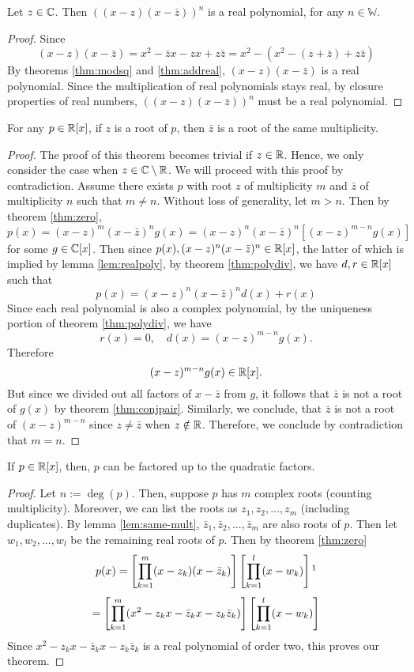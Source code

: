 \begin{lemma}
\label{lem:realpoly}
Let $z\in\mathbb{C}$. Then $((x-z)(x-\bar z))^n$ is a real polynomial, for any $n\in\mathbb{W}$.
\end{lemma}
\begin{proof}
	Since
	$$(x-z)(x-\bar z)=x^2-\bar z x -zx+z\bar z=x^2-(x^2-(z+\bar z)+z\bar z)$$
	By theorems \eqref{thm:modsq} and \eqref{thm:addreal},
	$(x-z)(x-\bar z)$ is a real polynomial. 
	Since the multiplication of real polynomials stays real, by closure properties of real numbers, $((x-z)(x-\bar z))^n$ must be a real polynomial.
\end{proof}


\begin{lemma}
\label{lem:same-mult}
	For any $p\in \mathbb{R}[x]$, if $z$ is a root of $p$, then $\bar z$ is a root of the same multiplicity.
\end{lemma}
\begin{proof}
	The proof of this theorem becomes trivial if $z\in \mathbb{R}$.
	Hence, we only consider the case when $z\in \mathbb{C}\setminus \mathbb{R}$.
	We will proceed with this proof by contradiction.
	Assume there exists $p$ with root $z$ of multiplicity $m$ and $\bar z$ of multiplicity $n$ such that $m\neq n$. 
	Without loss of generality, let $m>n$.
	Then by theorem \eqref{thm:zero},
	$$p(x)=(x-z)^m(x-\bar z)^n g(x)= (x-z)^n(x-\bar z)^n [(x-z)^{m-n} g(x)]$$
	for some $g\in \mathbb{C}[x]$.
	Then since $p(x),(x-z)^n(x-\bar z)^n\in \mathbb{R}[x]$, the latter of which is implied by lemma \eqref{lem:realpoly}, by theorem \eqref{thm:polydiv}, we have $d,r\in \mathbb{R}[x]$ such that
	$$p(x)=(x-z)^n(x-\bar z)^n d(x)+r(x)$$
	Since each real polynomial is also a complex polynomial, by the uniqueness portion of theorem \eqref{thm:polydiv}, we have
	$$r(x)=0, \quad d(x)=(x-z)^{m-n} g(x).$$
	Therefore
	$$(x-z)^{m-n} g(x) \in \mathbb{R}[x].$$
	But since we divided out all factors of $x-\bar z$ from $g$, it follows that $\bar z$ is not a root of $g(x)$ by theorem \eqref{thm:conjpair}. 
	Similarly, we conclude, that $\bar z$ is not a root of $(x-z)^{m-n}$ since $z\neq \bar z$ when $z\notin \mathbb{R}$.
	Therefore, we conclude by contradiction that $m=n$.
\end{proof}
\begin{theorem}
\label{thm:factor-quad}
If $p\in \mathbb{R}[x]$, then, $p$ can be factored up to the quadratic factors.	
\end{theorem}
\begin{proof}
	Let $n:=\deg(p)$.
	Then, suppose $p$ has $m$ complex roots (counting multiplicity).
	Moreover, we can list the roots as $z_1,z_2,...,z_m$ (including duplicates). 
	By lemma \eqref{lem:same-mult}, $\bar z_1,\bar z_2,...,\bar z_m$ are also roots of $p$.
	Then let $w_1,w_2,...,w_l$ be the remaining real roots of $p$.
	Then by theorem \eqref{thm:zero}
	$$p(x)=\sbrak{\prod^m_{k=1}(x-z_k)(x-\bar z_k)}
	\sbrak{\prod^l_{k=1}(x-w_k)}\footnotemark$$
	$$=\left[\prod^m_{k=1}(x^2-z_kx-\bar z_k x-z_k\bar z_k)\right]
	\left[\prod^l_{k=1}(x-w_k)\right]$$
	Since $x^2-z_kx-\bar z_k x-z_k\bar z_k$ is a real polynomial of order two, this proves our theorem.
\end{proof}

